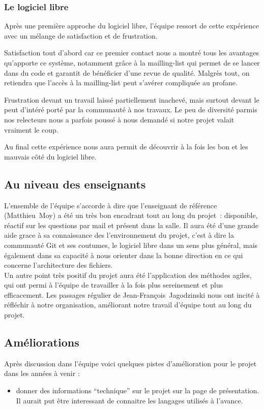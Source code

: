 \documentclass[11pt]{article}
\begin{document}
\subsubsection*{Le logiciel libre }

Après une première approche du logiciel libre, l'équipe ressort de cette 
expérience avec un mélange de satisfaction et de frustration.

Satisfaction tout d'abord car ce premier contact nous a montré tous les 
avantages qu'apporte ce système, notamment grâce à la mailling-list qui 
permet de se lancer dans du code et garantit de bénéficier d'une revue de
qualité. Malgrès tout, on retiendra que l'accès à la mailling-list peut 
s'avérer compliquée au profane.

Frustration devant un travail laissé partiellement inachevé, mais surtout
devant le peut d'intéré porté par la communauté à nos travaux. Le peu de
diversité parmis nos relecteurs nous a parfois poussé à nous demandé si
notre projet valait vraiment le coup. 

Au final cette expérience nous aura permit de découvrir à la fois les bon
et les mauvais côté du logiciel libre.


\subsection*{Au niveau des enseignants}

L'ensemble de l'équipe s'accorde à dire que l'enseignant de
  référence (Matthieu~Moy) a été un très bon encadrant tout au long du
  projet~: disponible, réactif sur les questions par mail et présent
  dans la salle. Il aura été d'une grande aide grace à sa connaissance
  des l'environnement du projet, c'est à dire la communauté Git et ses
  coutumes, le logiciel libre dans un sens plus général, mais
  également dans sa capacité à nous orienter dans la bonne direction
  en ce qui concerne l'architecture des fichiers.
  \\
  Un autre point très positif du projet aura été l'application des
  méthodes agiles, qui ont permi à l'équipe de travailler à la fois plus
  sereinement et plus efficacement. Les passages régulier de
  Jean-François~Jagodzinski nous ont incité à réfléchir à notre
  organisation, améliorant notre travail d'équipe tout au long du projet.

\subsection*{Améliorations}

Après discussion dans l'équipe voici quelques pistes d'amélioration pour le projet dans les années à venir : 

\begin{itemize}
\item donner des informations ``technique'' sur le projet sur la page de présentation. Il aurait put être interessant de connaitre les langages utilisés à l'avance. 
\end{itemize}
\end{document}
